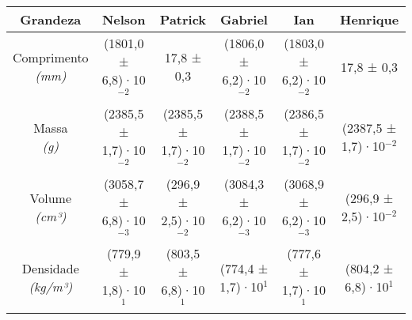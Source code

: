 \documentclass{article}
\begin{document}
\begin{table}[h!]
\centering
\begin{tabular}{c c c c c c }
\toprule
Grandeza & Nelson & Patrick & Gabriel & Ian & Henrique\\
\midrule
\shortstack{Comprimento\\\textit{(mm)}} & (1801,0 ± 6,8)·10$^{-2}$ & 17,8 ± 0,3 & (1806,0 ± 6,2)·10$^{-2}$ & (1803,0 ± 6,2)·10$^{-2}$ & 17,8 ± 0,3\\[4pt]
\shortstack{Massa\\\textit{(g)}} & (2385,5 ± 1,7)·10$^{-2}$ & (2385,5 ± 1,7)·10$^{-2}$ & (2388,5 ± 1,7)·10$^{-2}$ & (2386,5 ± 1,7)·10$^{-2}$ & (2387,5 ± 1,7)·10$^{-2}$\\[4pt]
\shortstack{Volume\\\textit{(cm³)}} & (3058,7 ± 6,8)·10$^{-3}$ & (296,9 ± 2,5)·10$^{-2}$ & (3084,3 ± 6,2)·10$^{-3}$ & (3068,9 ± 6,2)·10$^{-3}$ & (296,9 ± 2,5)·10$^{-2}$\\[4pt]
\shortstack{Densidade\\\textit{(kg/m³)}} & (779,9 ± 1,8)·10$^{1}$ & (803,5 ± 6,8)·10$^{1}$ & (774,4 ± 1,7)·10$^{1}$ & (777,6 ± 1,7)·10$^{1}$ & (804,2 ± 6,8)·10$^{1}$\\[4pt]
\bottomrule
\end{tabular}
\end{table}
\end{document}
